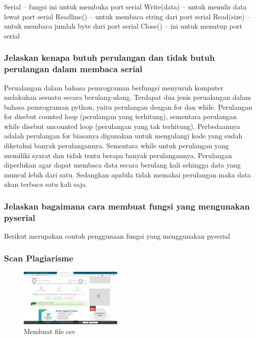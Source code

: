 Serial – fungsi ini untuk membuka port serial
Write(data) – untuk menulis data lewat port serial
Readline() – untuk membaca string dari port serial
Read(size) – untuk membaca jumlah byte dari port serial
Close() – ini untuk menutup port serial 

\subsubsection{Jelaskan kenapa butuh perulangan dan tidak butuh perulangan dalam membaca serial}


Perualangan dalam bahasa pemrograman berfungsi menyuruh komputer melakukan sesuatu secara berulang-ulang. Terdapat dua jenis perualangan dalam bahasa pemrograman python, yaitu perulangan dengan for dan while.
Perulangan for disebut counted loop (perulangan yang terhitung), sementara perulangan while disebut uncounted loop (perulangan yang tak terhitung). Perbedaannya adalah perulangan for biasanya digunakan untuk mengulangi kode yang sudah diketahui banyak perulangannya. Sementara while untuk perulangan yang memiliki syarat dan tidak tentu berapa banyak perulangannya.
Perulangan diperlukan agar dapat membaca data secara berulang kali sehingga data yang muncul lebih dari satu.  Sedangkan apabila tidak memakai perulangan maka data akan terbaca satu kali saja.

\subsubsection{Jelaskan bagaimana cara membuat fungsi yang mengunakan pyserial}


Berikut merupakan contoh penggunaan fungsi yang menggunakan pyserial


\subsubsection{Scan Plagiarisme}
\begin{figure}[H]	
    \includegraphics[width=5cm]{figures/5/1174070/Teori/nopla.png}
    \centering
    \caption{Membuat file csv}
\end{figure}

